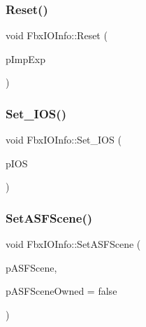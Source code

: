 \mbox{\label{class_fbx_i_o_info_a9fbc4993a076a3f91fdda9a29014dff4}} 
\subsubsection{\texorpdfstring{Reset()}{Reset()}}
{\footnotesize\ttfamily void Fbx\+I\+O\+Info\+::\+Reset (\begin{DoxyParamCaption}\item[{\hyperlink{class_fbx_i_o_info_a0c167beca637e7a1f723942694d61c75}{E\+Imp\+Exp}}]{p\+Imp\+Exp }\end{DoxyParamCaption})}

\mbox{\label{class_fbx_i_o_info_aa6b34fce0426b8f61f05262168c3004e}} 
\subsubsection{\texorpdfstring{Set\+\_\+\+I\+O\+S()}{Set\_IOS()}}
{\footnotesize\ttfamily void Fbx\+I\+O\+Info\+::\+Set\+\_\+\+I\+OS (\begin{DoxyParamCaption}\item[{\hyperlink{class_fbx_i_o_settings}{Fbx\+I\+O\+Settings} $\ast$}]{p\+I\+OS }\end{DoxyParamCaption})}

\mbox{\label{class_fbx_i_o_info_a03a29954f14eb3596b1d887fc68f9bfc}} 
\subsubsection{\texorpdfstring{Set\+A\+S\+F\+Scene()}{SetASFScene()}}
{\footnotesize\ttfamily void Fbx\+I\+O\+Info\+::\+Set\+A\+S\+F\+Scene (\begin{DoxyParamCaption}\item[{\hyperlink{class_fbx_object}{Fbx\+Object} $\ast$}]{p\+A\+S\+F\+Scene,  }\item[{bool}]{p\+A\+S\+F\+Scene\+Owned = {\ttfamily false} }\end{DoxyParamCaption})}

